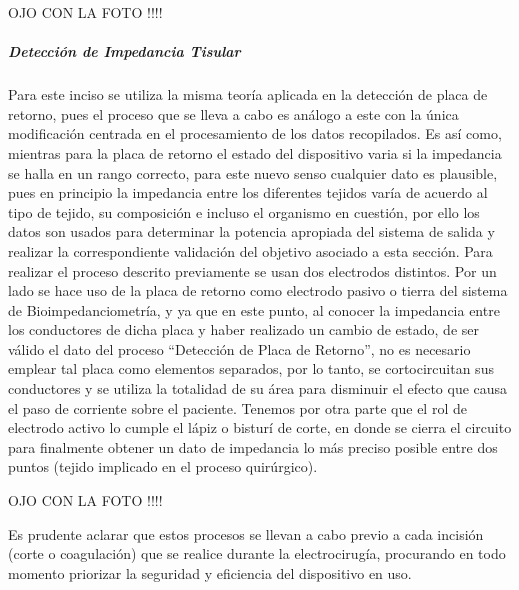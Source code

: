 \documentclass[12pt,letterpaper,spanish]{article}
\begin{document}
OJO CON LA FOTO !!!!

					\subparagraph{Detección de Impedancia Tisular}
					\hfill\break
Para este inciso se utiliza la misma teoría aplicada en la detección de placa de retorno, pues el proceso que se lleva a cabo es análogo a este con la única modificación centrada en el procesamiento de los datos recopilados. Es así como, mientras para la placa de retorno el estado del dispositivo varia si la impedancia se halla en un rango correcto, para este nuevo senso cualquier dato es plausible, pues en principio la impedancia entre los diferentes tejidos varía de acuerdo al tipo de tejido, su composición e incluso el organismo en cuestión, por ello los datos son usados para determinar la potencia apropiada del sistema de salida y realizar la correspondiente validación del objetivo asociado a esta sección.
Para realizar el proceso descrito previamente  se usan dos electrodos distintos. Por un lado se hace uso de la placa de retorno como electrodo pasivo o tierra del sistema de Bioimpedanciometría, y ya que en este punto, al conocer la impedancia entre los conductores de dicha placa y haber realizado un cambio de estado, de ser válido el dato del proceso “Detección de Placa de Retorno”, no es necesario emplear tal placa como elementos separados, por lo tanto, se cortocircuitan sus conductores y se utiliza la totalidad de su área para disminuir el efecto que causa el paso de corriente sobre el paciente. Tenemos por otra parte que el rol de electrodo activo lo cumple el lápiz o bisturí de corte, en donde se cierra el circuito para finalmente obtener un dato de impedancia lo más preciso posible entre dos puntos (tejido implicado en el proceso quirúrgico). 

OJO CON LA FOTO !!!!

Es prudente aclarar que estos procesos se llevan a cabo previo a cada incisión (corte o coagulación) que se realice durante la electrocirugía, procurando en todo momento priorizar la seguridad y eficiencia del dispositivo en uso.
\end{document}

